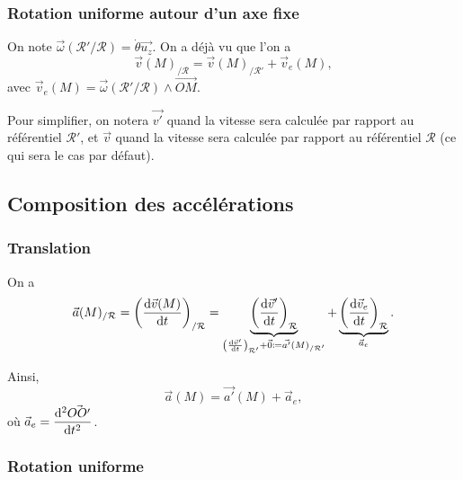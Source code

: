         \subsubsection{Rotation uniforme autour d'un axe fixe}

            On note $\vec{\omega}(\mathcal{R}'/\mathcal{R})=\dot{\theta}\vec{u_z}$. On a déjà vu que l'on a 
            \begin{equation}
                \vec{v}(M)_{/\mathcal{R}}=\vec{v}(M)_{/\mathcal{R}'}+\vec{v}_e(M),
            \end{equation}
            avec $\vec{v}_e(M)=\vec{\omega}(\mathcal{R}'/\mathcal{R})\wedge\vec{OM}$.

            Pour simplifier, on notera $\vec{v'}$ quand la vitesse sera calculée par rapport au référentiel $\mathcal{R}'$, et $\vec{v}$ quand la vitesse sera calculée par rapport au référentiel $\mathcal{R}$ (ce qui sera le cas par défaut).

    \subsection{Composition des accélérations}

        \subsubsection{Translation}

            On a
            \begin{equation}
                \vec{a}(M)_{/\mathcal{R}}=\left(\dfrac{\mathrm{d}\vec{v}(M)}{\mathrm{d} t}\right)_{/\mathcal{R}}=
                \underbrace{\left(\frac{\mathrm{d}\vec{v}'}{\mathrm{d} t}\right)_{\mathcal{R}}}_{\left(\frac{\mathrm{d}\vec{v}'}{\mathrm{d} t}\right)_{\mathcal{R}'}+\vec{0}\coloneqq\vec{a'}(M)_{/\mathcal{R}'}}
                +\underbrace{\left(\frac{\mathrm{d}\vec{v}_e}{\mathrm{d} t}\right)_{\mathcal{R}}}_{\vec{a}_e}.
            \end{equation}

            Ainsi,
            \begin{equation}
                \boxed{
                    \vec{a}(M)=\vec{a'}(M)+\vec{a}_e,
                }
            \end{equation}
            où $\vec{a}_e=\dfrac{\mathrm{d}^{2}\vec{OO'}}{\mathrm{d} t^{2}}$.

        \subsubsection{Rotation uniforme}

